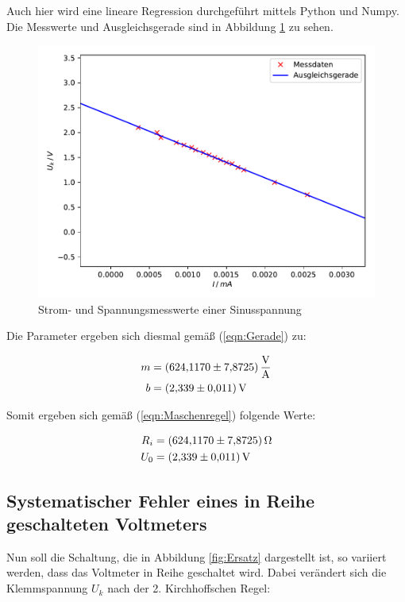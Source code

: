 Auch hier wird eine lineare Regression durchgeführt mittels Python 
und Numpy. Die Messwerte und Ausgleichsgerade sind in Abbildung \ref{fig:plot4}
zu sehen.

\begin{figure}
  \centering
  \includegraphics[scale=0.75]{content/plot4.pdf}
  \caption{Strom- und Spannungsmesswerte einer Sinusspannung}
  \label{fig:plot4}
\end{figure}

Die Parameter ergeben sich diesmal gemäß (\ref{eqn:Gerade}) zu: 

\begin{align*}
m &= \SI{624.117+-7.8725}{\volt\per\ampere}\\
b &= \SI{2.339+-0.011}{\volt}
\end{align*}

Somit ergeben sich gemäß (\ref{eqn:Maschenregel}) folgende Werte:

\begin{align*}
R_i &= \SI{624.117+-7.8725}{\ohm}\\
U_0 &= \SI{2.339+-0.011}{\volt}
\end{align*}

\subsection{Systematischer Fehler eines in Reihe geschalteten Voltmeters}

Nun soll die Schaltung, die in Abbildung \ref{fig:Ersatz} dargestellt ist, 
so variiert werden, dass das Voltmeter in Reihe geschaltet wird.
Dabei verändert sich die Klemmspannung $U_k$ nach der 2. Kirchhoffschen Regel:

